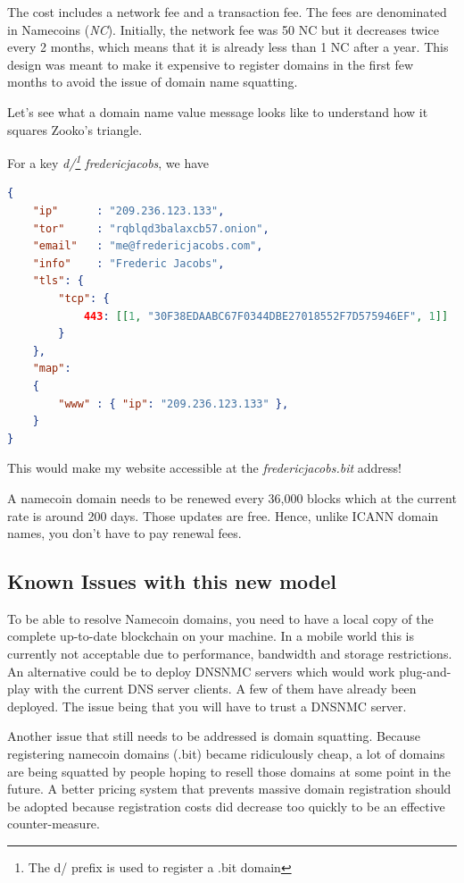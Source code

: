 \documentclass{vldb}
\begin{document}
The cost includes a network fee and a transaction fee. The fees are denominated in Namecoins (\emph{NC}). Initially, the network fee was 50 NC but it decreases twice every 2 months, which means that it is already less than 1 NC after a year. This design was meant to make it expensive to register domains in the first few months to avoid the issue of domain name squatting.

Let's see what a domain name value message looks like to understand how it squares Zooko's triangle.

For a key \emph{d/\footnote{The d/ prefix is used to register a .bit domain} fredericjacobs}, we have 

\begin{lstlisting}[language=json,firstnumber=1]
{
    "ip"      : "209.236.123.133",
    "tor"     : "rqblqd3balaxcb57.onion",
    "email"   : "me@fredericjacobs.com",
    "info"    : "Frederic Jacobs",
    "tls": {
        "tcp": {
            443: [[1, "30F38EDAABC67F0344DBE27018552F7D575946EF", 1]]
        }
    },
    "map":
    {
        "www" : { "ip": "209.236.123.133" },
    }
}
\end{lstlisting}

This would make my website accessible at the \emph{fredericjacobs.bit} address!

A namecoin domain needs to be renewed every 36,000 blocks which at the current rate is around 200 days. Those updates are free. Hence, unlike ICANN domain names, you don't have to pay renewal fees.

\subsection{Known Issues with this new model}

To be able to resolve Namecoin domains, you need to have a local copy  of the complete up-to-date blockchain on your machine. In a mobile world this is currently not acceptable due to performance, bandwidth and storage restrictions. An alternative could be to deploy DNSNMC servers which would work plug-and-play with the current DNS server clients. A few of them have already been deployed\cite{DNSNMCList}. The issue being that you will have to trust a DNSNMC\cite{okTurtles} server.

Another issue that still needs to be addressed is domain squatting. Because registering namecoin domains (.bit) became ridiculously cheap, a lot of domains are being squatted by people hoping to resell those domains at some point in the future. A better pricing system that prevents massive domain registration should be adopted because registration costs did decrease too quickly to be an effective counter-measure.
\end{document}

